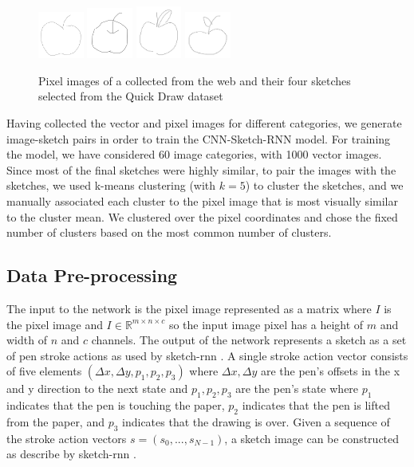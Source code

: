 \documentclass{article}
\begin{document}
\begin{figure}[H]
\includegraphics[width=1.5cm]{images/apple00247(1).png}
\includegraphics[width=1.5cm]{images/apple00247(2).png}
\includegraphics[width=1.5cm]{images/apple00247(3).png}
\includegraphics[width=1.5cm]{images/apple00247(4).png}\\
\caption{Pixel images of a  collected from the web and their four sketches selected from the Quick Draw dataset \cite{quickdraw}}
\end{figure}

Having collected the vector and pixel images for different categories, we generate image-sketch pairs in order to train the CNN-Sketch-RNN model. For training the model, we have considered 60 image categories, with 1000 vector images. Since most of the final sketches were highly similar, to pair the images with the sketches, we used k-means clustering  (with $k = 5$) to cluster the sketches, and we manually associated each cluster to the pixel image that is most visually similar to the cluster mean. We clustered over the pixel coordinates and chose the fixed number of clusters based on the most common number of clusters.

\subsection{Data Pre-processing}
The input to the network is the pixel image represented as a matrix where $I$ is the pixel image and $I\in \mathbb{R}^{m\times n\times c}$ so the input image pixel has a height of $m$ and width of $n$ and $c$ channels. The output of the network represents a sketch as a set of pen stroke actions as used by sketch-rnn \cite{qdpaper}. A single stroke action vector consists of five elements $(\Delta x, \Delta y, p_{1}, p_{2}, p_{3})$ where $\Delta x, \Delta y$ are the pen's offsets in the x and y direction to the next state and $p_{1}, p_{2}, p_{3}$ are the pen's state where $p_{1}$ indicates that the pen is touching the paper, $p_{2}$ indicates that the pen is lifted from the paper, and $p_{3}$ indicates that the drawing is over. Given a sequence of the stroke action vectors $s = (s_{0}, ..., s_{N-1})$, a sketch image can be constructed as describe by sketch-rnn \cite{qdpaper}.
\end{document}
